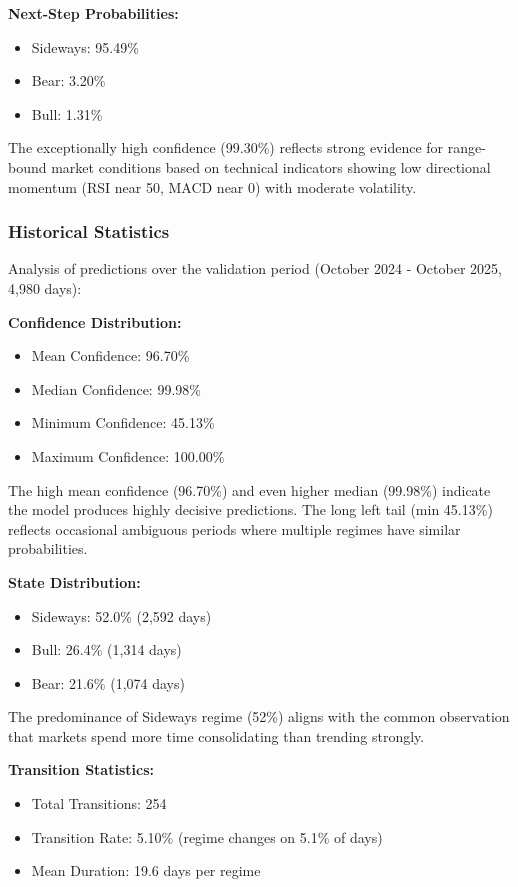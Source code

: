 \documentclass[conference]{IEEEtran}
\begin{document}
\textbf{Next-Step Probabilities:}
\begin{itemize}
\item Sideways: 95.49\%
\item Bear: 3.20\%
\item Bull: 1.31\%
\end{itemize}

The exceptionally high confidence (99.30\%) reflects strong evidence for range-bound market conditions based on technical indicators showing low directional momentum (RSI near 50, MACD near 0) with moderate volatility.

\subsubsection{Historical Statistics}
Analysis of predictions over the validation period (October 2024 - October 2025, 4,980 days):

\textbf{Confidence Distribution:}
\begin{itemize}
\item Mean Confidence: 96.70\%
\item Median Confidence: 99.98\%
\item Minimum Confidence: 45.13\%
\item Maximum Confidence: 100.00\%
\end{itemize}

The high mean confidence (96.70\%) and even higher median (99.98\%) indicate the model produces highly decisive predictions. The long left tail (min 45.13\%) reflects occasional ambiguous periods where multiple regimes have similar probabilities.

\textbf{State Distribution:}
\begin{itemize}
\item Sideways: 52.0\% (2,592 days)
\item Bull: 26.4\% (1,314 days)
\item Bear: 21.6\% (1,074 days)
\end{itemize}

The predominance of Sideways regime (52\%) aligns with the common observation that markets spend more time consolidating than trending strongly.

\textbf{Transition Statistics:}
\begin{itemize}
\item Total Transitions: 254
\item Transition Rate: 5.10\% (regime changes on 5.1\% of days)
\item Mean Duration: 19.6 days per regime
\end{itemize}
\end{document}
